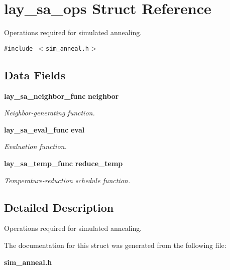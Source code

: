 \section{lay\_\-sa\_\-ops Struct Reference}
\label{structlay__sa__ops}
Operations required for simulated annealing.  


{\tt \#include $<$sim\_\-anneal.h$>$}

\subsection*{Data Fields}
\begin{CompactItemize}
\item 
{\bf lay\_\-sa\_\-neighbor\_\-func} {\bf neighbor}\label{structlay__sa__ops_o0}

\begin{CompactList}\small\item\em Neighbor-generating function. \item\end{CompactList}\item 
{\bf lay\_\-sa\_\-eval\_\-func} {\bf eval}\label{structlay__sa__ops_o1}

\begin{CompactList}\small\item\em Evaluation function. \item\end{CompactList}\item 
{\bf lay\_\-sa\_\-temp\_\-func} {\bf reduce\_\-temp}\label{structlay__sa__ops_o2}

\begin{CompactList}\small\item\em Temperature-reduction schedule function. \item\end{CompactList}\end{CompactItemize}


\subsection{Detailed Description}
Operations required for simulated annealing. 



The documentation for this struct was generated from the following file:\begin{CompactItemize}
\item 
{\bf sim\_\-anneal.h}\end{CompactItemize}
